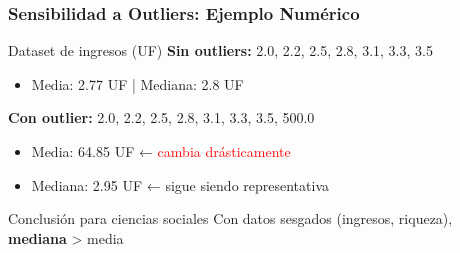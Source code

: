 \documentclass[aspectratio=169,11pt]{beamer}
\begin{document}
\begin{frame}[fragile]
\frametitle{Sensibilidad a Outliers: Ejemplo Numérico}
\small

\begin{block}{Dataset de ingresos (UF)}
  \textbf{Sin outliers:} 2.0, 2.2, 2.5, 2.8, 3.1, 3.3, 3.5
  \begin{itemize}
    \item Media: 2.77 UF | Mediana: 2.8 UF
  \end{itemize}

  \pause
  \vspace{0.15cm}
  \textbf{Con outlier:} 2.0, 2.2, 2.5, 2.8, 3.1, 3.3, 3.5, 500.0
  \begin{itemize}
    \item Media: 64.85 UF ← \textcolor{red}{cambia drásticamente}
    \item Mediana: 2.95 UF ← sigue siendo representativa
  \end{itemize}
\end{block}

\pause

\begin{alertblock}{Conclusión para ciencias sociales}
  \small Con datos sesgados (ingresos, riqueza), \textbf{mediana} > media
\end{alertblock}
\end{frame}
\end{document}
